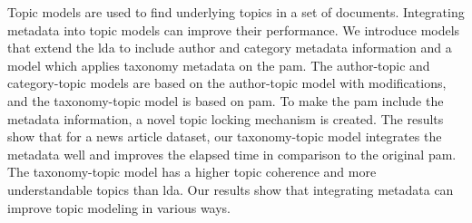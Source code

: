Topic models are used to find underlying topics in a set of documents.
Integrating metadata into topic models can improve their performance.
We introduce models that extend the \gls{lda} to include author and category metadata information and a model which applies taxonomy metadata on the \gls{pam}.
The author-topic and category-topic models are based on the author-topic model with modifications, and the taxonomy-topic model is based on \gls{pam}.
To make the \gls{pam} include the metadata information, a novel topic locking mechanism is created.
The results show that for a news article dataset, our taxonomy-topic model integrates the metadata well and improves the elapsed time in comparison to the original \gls{pam}.
The taxonomy-topic model has a higher topic coherence and more understandable topics than \gls{lda}.
Our results show that integrating metadata can improve topic modeling in various ways.
